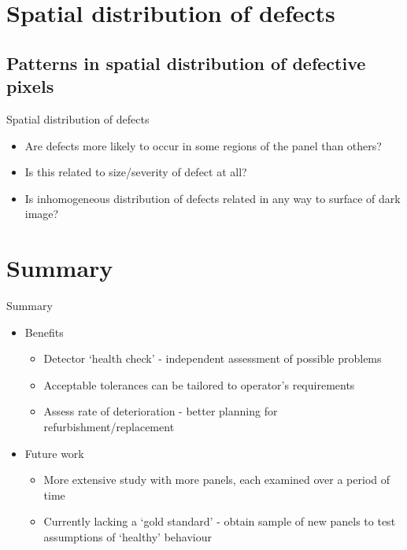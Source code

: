 \documentclass{beamer}
\begin{document}


\section{Spatial distribution of defects}
\subsection{Patterns in spatial distribution of defective pixels}

\begin{frame}{Spatial distribution of defects}

	\begin{itemize}
		\item Are defects more likely to occur in some regions of the panel than others?
		\item Is this related to size/severity of defect at all?
		\item Is inhomogeneous distribution of defects related in any way to surface of dark image?
	\end{itemize}

\end{frame}



\section*{Summary}

\begin{frame}{Summary}

  \begin{itemize}
  \item
  	Benefits
  	\begin{itemize}
    \item
    		Detector `health check' - independent assessment of possible problems
    	\item
    		Acceptable tolerances can be tailored to operator's requirements
  	\item
    		Assess rate of deterioration - better planning for refurbishment/replacement
    	\end{itemize}
  \end{itemize}
  
  \begin{itemize}
  \item
    Future work
    \begin{itemize}
    \item
      More extensive study with more panels, each examined over a period of time 
    \item
    	  Currently lacking a `gold standard' - obtain sample of new panels to test assumptions of `healthy' behaviour
    \end{itemize}
  \end{itemize}
  
\end{frame}
\end{document}
